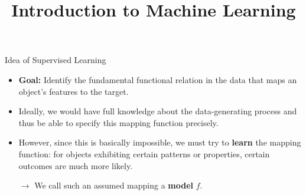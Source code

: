 \documentclass[11pt,compress,t,notes=noshow, xcolor=table]{beamer}
\title{Introduction to Machine Learning}
\institute{\href{https://compstat-lmu.github.io/lecture_i2ml/}{compstat-lmu.github.io/lecture\_i2ml}}
\date{}
\begin{document}









\begin{vbframe}{Idea of Supervised Learning}

\begin{itemize}

  \item \textbf{Goal:} Identify the fundamental functional relation in the data 
  that maps an object's features to the target.
  
  \item Ideally, we would have full knowledge about the data-generating process
  and thus be able to specify this mapping function precisely.
  
  \item However, since this is basically impossible, we must try to 
  \textbf{learn} the mapping function: for objects exhibiting certain 
  patterns or properties, certain outcomes are much more likely.
  
  $\rightarrow$ We call such an assumed mapping a \textbf{model} $f$.
  
  
\end{itemize}  

\framebreak

\begin{itemize}

  

\end{itemize}
\end{vbframe}
\end{document}
